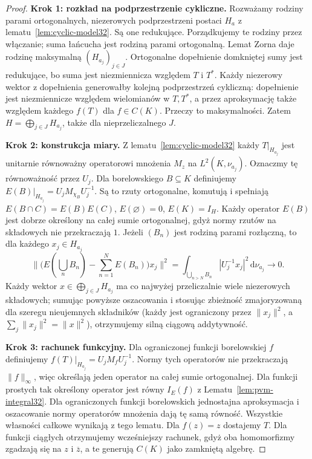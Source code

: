 \begin{proof}
\textbf{Krok 1: rozkład na podprzestrzenie cykliczne.}
Rozważamy rodziny parami ortogonalnych, niezerowych podprzestrzeni
postaci $H_a$ z lematu~\ref{lem:cyclic-model32}. Są one redukujące.
Porządkujemy te rodziny przez włączanie; suma łańcucha
jest rodziną parami ortogonalną. Lemat Zorna daje
rodzinę maksymalną $(H_{a_j})_{j\in J}$.
Ortogonalne dopełnienie domkniętej sumy jest redukujące,
bo suma jest niezmiennicza względem $T$ i $T^*$.
Każdy niezerowy wektor z dopełnienia generowałby kolejną
podprzestrzeń cykliczną: dopełnienie jest niezmiennicze
względem wielomianów w $T,T^*$, a przez aproksymację
także względem każdego $f(T)$ dla $f\in C(K)$.
Przeczy to maksymalności.
Zatem $H=\bigoplus_{j\in J}H_{a_j}$, także dla nieprzeliczalnego $J$.

\textbf{Krok 2: konstrukcja miary.}
Z lematu~\ref{lem:cyclic-model32} każdy $T|_{H_{a_j}}$
jest unitarnie równoważny operatorowi mnożenia $M_z$ na
$L^2(K,\nu_{a_j})$. Oznaczmy tę równoważność przez $U_j$.
Dla borelowskiego $B\subseteq K$ definiujemy
$E(B)|_{H_{a_j}}=U_jM_{\chi_B}U_j^{-1}$.
Są to rzuty ortogonalne, komutują i spełniają
$E(B\cap C)=E(B)E(C)$, $E(\varnothing)=0$, $E(K)=I_H$.
Każdy operator $E(B)$ jest dobrze określony na całej sumie
ortogonalnej, gdyż normy rzutów na składowych nie przekraczają $1$.
Jeżeli $(B_n)$ jest
rodziną parami rozłączną, to dla każdego $x_j\in H_{a_j}$
\[
 \bigl\|\bigl(E(\textstyle\bigcup_n B_n)
 -\sum_{n=1}^{N}E(B_n)\bigr)x_j\bigr\|^2
 =\int_{\bigcup_{n>N}B_n}|U_j^{-1}x_j|^2\,\mathrm d\nu_{a_j}
 \longrightarrow0.
\]
Każdy wektor $x\in\bigoplus_{j\in J}H_{a_j}$ ma co najwyżej
przeliczalnie wiele niezerowych składowych; sumując powyższe
oszacowania i stosując zbieżność zmajoryzowaną dla szeregu
nieujemnych składników (każdy jest ograniczony przez
$\|x_j\|^2$, a $\sum_j\|x_j\|^2=\|x\|^2$),
otrzymujemy silną ciągową addytywność.

\textbf{Krok 3: rachunek funkcyjny.}
Dla ograniczonej funkcji borelowskiej $f$ definiujemy
$f(T)|_{H_{a_j}}=U_jM_fU_j^{-1}$.
Normy tych operatorów nie przekraczają $\|f\|_\infty$,
więc określają jeden operator na całej sumie ortogonalnej.
Dla funkcji prostych tak określony operator jest równy
$I_E(f)$ z Lematu~\ref{lem:pvm-integral32}. Dla
ograniczonych funkcji borelowskich jednostajna aproksymacja
i oszacowanie normy operatorów mnożenia dają tę samą
równość. Wszystkie własności całkowe wynikają z tego lematu.
Dla $f(z)=z$ dostajemy $T$. Dla funkcji ciągłych
otrzymujemy wcześniejszy rachunek, gdyż oba homomorfizmy
zgadzają się na $z$ i $\overline z$, a te generują
$C(K)$ jako zamkniętą algebrę.


\end{proof}
